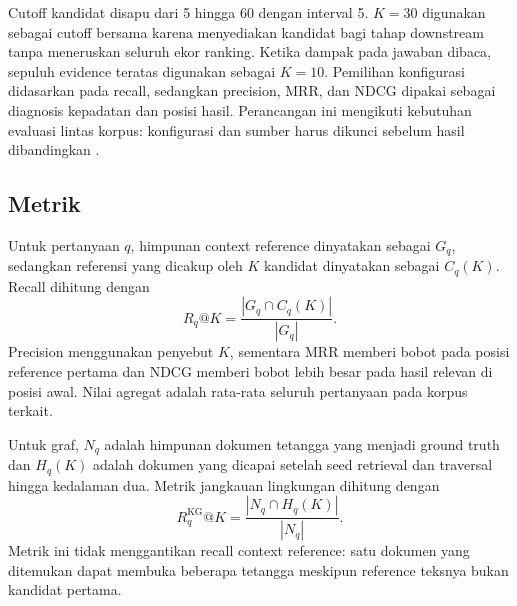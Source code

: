 Cutoff kandidat disapu dari 5 hingga 60 dengan interval 5. $K=30$ digunakan sebagai cutoff bersama karena menyediakan kandidat bagi tahap downstream tanpa meneruskan seluruh ekor ranking. Ketika dampak pada jawaban dibaca, sepuluh evidence teratas digunakan sebagai $K=10$. Pemilihan konfigurasi didasarkan pada recall, sedangkan precision, MRR, dan NDCG dipakai sebagai diagnosis kepadatan dan posisi hasil. Perancangan ini mengikuti kebutuhan evaluasi lintas korpus: konfigurasi dan sumber harus dikunci sebelum hasil dibandingkan \cite{thakurBEIRHeterogeneousBenchmark2021}.

\subsection{Metrik}

Untuk pertanyaan $q$, himpunan context reference dinyatakan sebagai $G_q$, sedangkan referensi yang dicakup oleh $K$ kandidat dinyatakan sebagai $C_q(K)$. Recall dihitung dengan
\begin{equation}
R_q@K=\frac{|G_q\cap C_q(K)|}{|G_q|}.
\label{eq:recall-paper}
\end{equation}
Precision menggunakan penyebut $K$, sementara MRR memberi bobot pada posisi reference pertama dan NDCG memberi bobot lebih besar pada hasil relevan di posisi awal. Nilai agregat adalah rata-rata seluruh pertanyaan pada korpus terkait.

Untuk graf, $N_q$ adalah himpunan dokumen tetangga yang menjadi ground truth dan $H_q(K)$ adalah dokumen yang dicapai setelah seed retrieval dan traversal hingga kedalaman dua. Metrik jangkauan lingkungan dihitung dengan
\begin{equation}
R^{\mathrm{KG}}_q@K=\frac{|N_q\cap H_q(K)|}{|N_q|}.
\label{eq:kg-recall-paper}
\end{equation}
Metrik ini tidak menggantikan recall context reference: satu dokumen yang ditemukan dapat membuka beberapa tetangga meskipun reference teksnya bukan kandidat pertama.
